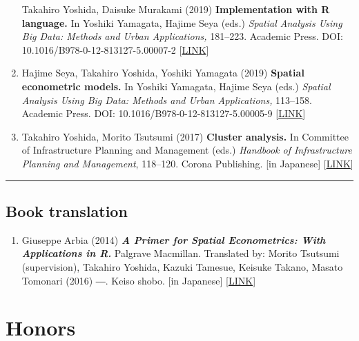 \documentclass[]{book}
\providecommand{\tightlist}{%
  \setlength{\itemsep}{0pt}\setlength{\parskip}{0pt}}
\begin{document}
\begin{enumerate}
  Takahiro Yoshida, Daisuke Murakami (2019)
  \textbf{Implementation with R language.}
  In Yoshiki Yamagata, Hajime Seya (eds.)
  \emph{Spatial Analysis Using Big Data: Methods and Urban Applications,} 181--223. Academic Press.
  DOI: 10.1016/B978-0-12-813127-5.00007-2 {[}\href{https://www.elsevier.com/books/spatial-analysis-using-big-data/yamagata/978-0-12-813127-5}{LINK}{]}
\item
  Hajime Seya, Takahiro Yoshida, Yoshiki Yamagata (2019)
  \textbf{Spatial econometric models.}
  In Yoshiki Yamagata, Hajime Seya (eds.)
  \emph{Spatial Analysis Using Big Data: Methods and Urban Applications,} 113--158. Academic Press.
  DOI: 10.1016/B978-0-12-813127-5.00005-9 {[}\href{https://www.elsevier.com/books/spatial-analysis-using-big-data/yamagata/978-0-12-813127-5}{LINK}{]}
\item
  Takahiro Yoshida, Morito Tsutsumi (2017)
  \textbf{Cluster analysis.}
  In Committee of Infrastructure Planning and Management (eds.)
  \emph{Handbook of Infrastructure Planning and Management}, 118--120. Corona Publishing.
  {[}in Japanese{]} {[}\href{http://www.coronasha.co.jp/doboku-hb.html}{LINK}{]}
\end{enumerate}

\begin{center}\rule{0.5\linewidth}{\linethickness}\end{center}

\hypertarget{book-translation}{%
\section*{Book translation}\label{book-translation}}

\begin{enumerate}
\def\labelenumi{\arabic{enumi}.}
\tightlist
\item
  Giuseppe Arbia (2014)
  \textbf{\emph{A Primer for Spatial Econometrics: With Applications in R.}} Palgrave Macmillan.
  Translated by: Morito Tsutsumi (supervision), Takahiro Yoshida, Kazuki Tamesue, Keisuke Takano, Masato Tomonari (2016) ―. Keiso shobo.
  {[}in Japanese{]} {[}\href{http://www.keisoshobo.co.jp/book/b222571.html}{LINK}{]}
\end{enumerate}

\hypertarget{honors}{%
\chapter*{Honors}\label{honors}}
\end{document}

